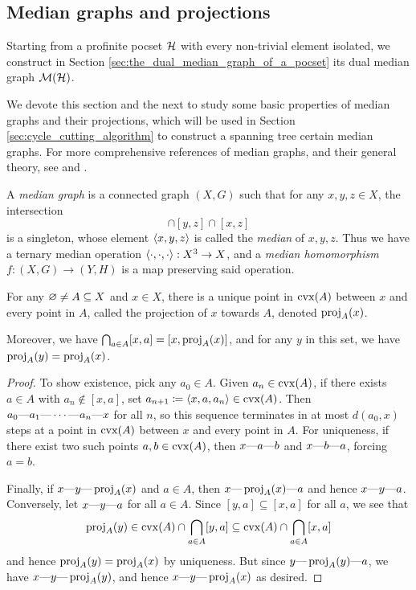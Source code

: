 \documentclass[reqno]{amsart}
\begin{document}
    \subsection{Median graphs and projections}

    Starting from a profinite pocset $\mc{H}$ with every non-trivial element isolated, we construct in Section \ref{sec:the_dual_median_graph_of_a_pocset} its dual median graph $\mc{M}(\mc{H})$.

    We devote this section and the next to study some basic properties of median graphs and their projections, which will be used in Section \ref{sec:cycle_cutting_algorithm} to construct a spanning tree certain median graphs. For more comprehensive references of median graphs, and their general theory, see \cite{Rol98} and \cite{Bow22}.

    \begin{definition}
        A \textit{median graph} is a connected graph $(X,G)$ such that for any $x,y,z\in X$, the intersection
        \begin{equation*}
            [x,y]\cap[y,z]\cap[x,z]
        \end{equation*}
        is a singleton, whose element $\l\langle x,y,z\r\rangle$ is called the \textit{median} of $x,y,z$. Thus we have a ternary median operation $\l\langle\cdot,\cdot,\cdot\r\rangle:X^3\to X$, and a \textit{median homomorphism} $f:(X,G)\to(Y,H)$ is a map preserving said operation.
    \end{definition}

    \begin{lemma}\label{lem:projections}
        For any $\em\neq A\subseteq X$ and $x\in X$, there is a unique point in $\cvx(A)$ between $x$ and every point in $A$, called the $\mathrm{projection}$ of $x$ towards $A$, denoted $\proj_A(x)$.

        Moreover, we have $\bigcap_{a\in A}[x,a]=[x,\proj_A(x)]$, and for any $y$ in this set, we have $\proj_A(y)=\proj_A(x)$.
    \end{lemma}
    \begin{proof}
        To show existence, pick any $a_0\in A$. Given $a_n\in\cvx(A)$, if there exists $a\in A$ with $a_n\not\in[x,a]$, set $a_{n+1}\coloneqq\l\langle x,a,a_n\r\rangle\in\cvx(A)$. Then $a_0\-a_1\-\cdots\-a_n\-x$ for all $n$, so this sequence terminates in at most $d(a_0,x)$ steps at a point in $\cvx(A)$ between $x$ and every point in $A$. For uniqueness, if there exist two such points $a,b\in\cvx(A)$, then $x\-a\-b$ and $x\-b\-a$, forcing $a=b$.

        Finally, if $x\-y\-\proj_A(x)$ and $a\in A$, then $x\-\proj_A(x)\-a$ and hence $x\-y\-a$. Conversely, let $x\-y\-a$ for all $a\in A$. Since $[y,a]\subseteq[x,a]$ for all $a$, we see that
        \begin{equation*}
            \proj_A(y)\in\cvx(A)\cap\bigcap_{a\in A}[y,a]\subseteq\cvx(A)\cap\bigcap_{a\in A}[x,a]
        \end{equation*}
        and hence $\proj_A(y)=\proj_A(x)$ by uniqueness. But since $y\-\proj_A(y)\-a$, we have $x\-y\-\proj_A(y)$, and hence $x\-y\-\proj_A(x)$ as desired.
    \end{proof}
\end{document}
